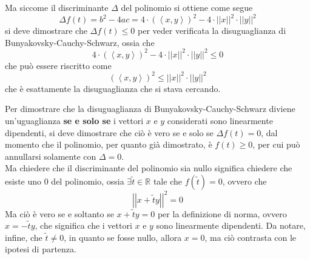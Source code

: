 \documentclass[a4paper]{extarticle}
\begin{document}
\begin{itemize}
    Ma siccome il discriminante $\Delta$ del polinomio si ottiene come segue
    \[\Delta f(t) = b^2 - 4ac = 4 \cdot \left(\left<x,y\right>\right)^2 - 4 \cdot \left \vert \left \vert x \right \vert \right \vert^2 \cdot \left \vert \left \vert y \right \vert \right \vert^2\]
    si deve dimostrare che $\Delta f(t) \leq 0$ per veder verificata la disuguaglianza di Bunyakovsky-Cauchy-Schwarz, ossia che
    \[4 \cdot \left(\left<x,y\right>\right)^2 - 4 \cdot \left \vert \left \vert x \right \vert \right \vert^2 \cdot \left \vert \left \vert y \right \vert \right \vert^2 \leq 0\]
    che può essere riscritto come
    \[\left(\left<x,y\right>\right)^2 \leq \left \vert \left \vert x \right \vert \right \vert^2 \cdot \left \vert \left \vert y \right \vert \right \vert^2\]
    che è esattamente la disuguaglianza che si stava cercando.
\end{itemize}
Per dimostrare che la disuguaglianza di Bunyakovsky-Cauchy-Schwarz diviene un'uguaglianza \textbf{se e solo se} i vettori $x$ e $y$ considerati sono linearmente dipendenti, si deve dimostrare che ciò è vero se e solo se $\Delta f(t) = 0$, dal momento che il polinomio, per quanto già dimostrato, è $f(t) \geq 0$, per cui può annullarsi solamente con $\Delta=0$.\\
Ma chiedere che il discriminante del polinomio sia nullo significa chiedere che esiste uno $0$ del polinomio, ossia $\exists \tilde{t} \in \mathbb{R}$ tale che $f(\tilde{t})=0$, ovvero che
\[\left \vert \left \vert x+ \tilde{t}y \right \vert \right \vert^2 = 0\]
Ma ciò è vero se e soltanto se $x+ \tilde{t}y=0$ per la definizione di norma, ovvero $x=-\tilde{t}y$, che significa che i vettori $x$ e $y$ sono linearmente dipendenti. Da notare, infine, che $\tilde{t} \neq 0$, in quanto se fosse nullo, allora $x=0$, ma ciò contrasta con le ipotesi di partenza.
\end{document}
